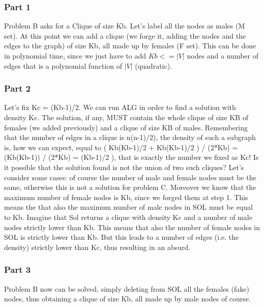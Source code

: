 \subsubsection{Part 1}
Problem B asks for a Clique of size Kb. Let's label all the nodes as males (M set). At this point we can add a clique (we forge it, adding the nodes and the edges to the graph) of size Kb, all made up by females (F set). This can be done in polynomial time, since we just have to add $Kb <= |V|$ nodes and a number of edges that is a polynomial function of $|V|$ (quadratic). 

\subsubsection{Part 2}
Let's fix Kc = (Kb-1)/2. 
We can run ALG in order to find a solution with density Kc. The solution, if any, MUST contain the whole clique of size KB of females (we added previously) and a clique of size KB of males. Remembering that the number of edges in a clique is n(n-1)/2), the density of such a subgraph is, how we can expect, equal to ( Kb(Kb-1)/2 + Kb(Kb-1)/2 ) / (2*Kb) = (Kb(Kb-1)) / (2*Kb) = (Kb-1)/2 ), that is exactly the number we fixed as Kc!
Is it possible that the solution found is not the union of two such cliques? Let's consider some cases:
of course the number of male and female nodes must be the same, otherwise this is not a solution for problem C. Moreover we know that the maximum number of female nodes is Kb, since we forged them at step 1. This means the that also the maximum number of male nodes in SOL must be equal to Kb.
Imagine that Sol returns a clique with density Kc and a number of male nodes strictly lower than Kb. This means that also the number of female nodes in SOL is strictly lower than Kb. But this leads to a number of edges (i.e. the density) strictly lower than Kc, thus resulting in an absurd.
\subsubsection{Part 3}
Problem B now can be solved, simply deleting from SOL all the females (fake) nodes, thus obtaining a clique of size Kb, all made up by male nodes of course.
